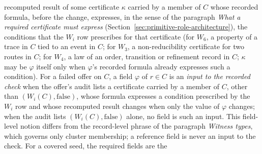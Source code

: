 \documentclass[11pt]{article}
\theoremstyle{definition}
\begin{document}
recomputed result of some certificate \(\kappa\) carried by a member of \(C\)
whose recorded formula, before the change, expresses, in the sense of the paragraph \emph{What a required certificate must
express} (Section~\ref{sec:primitive-role-architecture}), the
conditions that the \(W_i\) row prescribes
for that certificate (for
\(W_6\), a property of a trace in \(C\) tied to an event in \(C\); for \(W_3\), a
non-reducibility certificate for two routes in \(C\); for \(W_4\), a law of an
order, transition or refinement record in \(C\); \(\kappa\) may be \(\varphi\)
itself only when \(\varphi\)'s recorded formula already expresses such a
condition). For a failed offer on \(C\), a
field \(\varphi\) of \(r\in C\) is an \emph{input to the recorded check} when the
offer's audit lists a certificate carried by a member of \(C\), other than
\((W_i(C),\mathrm{false})\), whose formula expresses a condition prescribed by
the \(W_i\) row and whose recomputed result changes when only the value of
\(\varphi\) changes; when the audit lists \((W_i(C),\mathrm{false})\) alone, no
field is such an input. This field-level notion differs from the record-level
phrase of the paragraph \emph{Witness types}, which governs only cluster
membership; a reference field is never an input to the check. For a covered seed, the required fields are the
\end{document}

